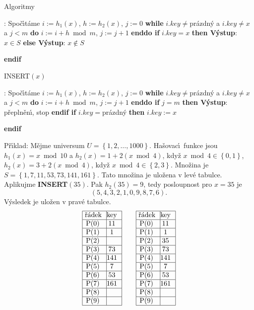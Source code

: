 \subhead
Algoritmy
\endsubhead
\smallskip

:\newline 
Spo\v c\'\i t\'ame $i:=h_1\left(x\right)$, $h:=h_2\left(x\right)$, $j:=0$\newline 
{\bf while} $i.key\ne$pr\'azdn\'y a $i.key\ne x$ a $j<m$ {\bf do} $
i:=i+h\bmod m$, $j:=j+1$ {\bf enddo\newline 
if} $i.key=x$ {\bf then V\'ystup}: $x\in S$ {\bf else V\'ystup}: $
x\notin S$ {\bf endif
\medskip

\flushpar INSERT$\left(x\right)$}:\newline 
Spo\v c\'\i t\'ame $i:=h_1\left(x\right)$, $h:=h_2\left(x\right)$, $j:=0$\newline 
{\bf while} $i.key\ne$pr\'azdn\'y a $i.key\ne x$ a $j<m$ {\bf do} $
i:=i+h\bmod m$, $j:=j+1$ {\bf enddo\newline 
if} $j=m$ {\bf then V\'ystup}: p\v repln\v en\'\i , stop {\bf endif\newline 
if} $i.key=$pr\'azdn\'y {\bf then} $i.key:=x$ {\bf endif
\medskip

}\flushpar P\v r\'\i klad: M\v ejme universum $U=\left\{1,2,\dots,1000
\right\}$. 
Ha\v sovac\'\i\ funkce jsou 
$h_1\left(x\right)=x\bmod10$ a $h_2\left(x\right)=1+2\left(x\bmod4\right)$, kdy\v z 
$x\bmod4\in \left\{0,1\right\}$, $h_2\left(x\right)=3+2\left(x\bmod4\right)$, kdy\v z $x\bmod4\in 
\left\{2,3\right\}$. 
Mno\v zina je  $S=\left\{1,7,11,53,73,141,161\right\}$. Tato mno\v zina je ulo\v zena v 
lev\'e tabulce. Aplikujme {\bf INSERT$\left(35\right)$}. Pak $h_2\left(35\right)=9$, tedy 
posloupnost pro $x=35$ je 
$$\left(5,4,3,2,1,0,9,8,7,6\right).$$
V\'ysledek je ulo\v zen v prav\'e tabulce. 
$$\vbox {\hbox{\vtop{\offinterlineskip\halign{\strut\vrule\ # & \vrule\hfil# \hfil\vrule\cr\noalign{\hrule}\v r\'adek & key \hfil\cr\noalign{\hrule}P(0) & 11 \cr\noalign{\hrule}P(1) & 1 \cr\noalign{\hrule}P(2) & \hfill \cr\noalign{\hrule}P(3) & 73 \cr\noalign{\hrule}P(4) & 141 \cr\noalign{\hrule}P(5) & 7 \cr\noalign{\hrule}P(6) & 53 \cr\noalign{\hrule}P(7) & 161 \cr\noalign{\hrule}P(8) & \hfill\cr\noalign{\hrule}P(9) & \hfill \cr\noalign{\hrule}}}\qquad\vtop{\offinterlineskip\halign {\strut\vrule\ # & \vrule \hfil # \hfil \vrule\cr\noalign{\hrule}\v r\'adek & key \hfil \cr\noalign{\hrule}P(0) & 11 \cr\noalign{\hrule}P(1) & 1 \cr\noalign{\hrule}P(2) & 35 \cr\noalign{\hrule}P(3) & 73 \cr\noalign{\hrule}P(4) & 141 \cr\noalign{\hrule}P(5) & 7 \cr\noalign{\hrule}P(6) & 53 \cr\noalign{\hrule}P(7) & 161 \cr\noalign{\hrule}P(8) & \hfill \cr\noalign{\hrule}P(9) & \hfill \cr\noalign{\hrule}}}}}$$

